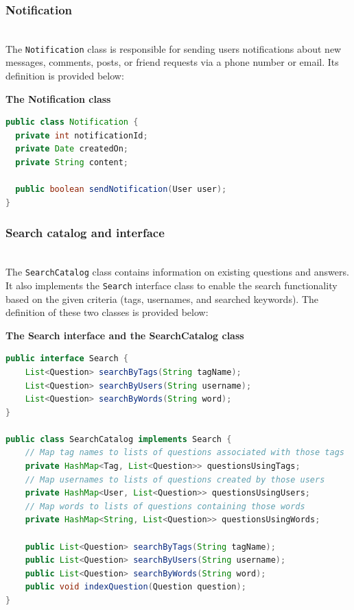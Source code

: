 \subsubsection{Notification}\label{0ZVCay7W6Bkab1KXP_cLz}
\\
The \texttt{Notification} class is responsible for sending users notifications about new messages, comments, posts, or friend requests via a phone number or email. Its definition is provided below:

\textbf{The Notification class}

\begin{lstlisting}[language=Java]
public class Notification {
  private int notificationId;
  private Date createdOn;
  private String content;

  public boolean sendNotification(User user);
}
\end{lstlisting}

\subsubsection{Search catalog and interface}\label{julu7b82zRwsJjYIajaE4-2}
\\
The \texttt{SearchCatalog} class contains information on existing questions and answers. It also implements the \texttt{Search} interface class to enable the search functionality based on the given criteria (tags, usernames, and searched keywords). The definition of these two classes is provided below:

\textbf{The Search interface and the SearchCatalog class}

\begin{lstlisting}[language=Java]
public interface Search {
    List<Question> searchByTags(String tagName);
    List<Question> searchByUsers(String username);
    List<Question> searchByWords(String word);
}

public class SearchCatalog implements Search {
    // Map tag names to lists of questions associated with those tags
    private HashMap<Tag, List<Question>> questionsUsingTags;
    // Map usernames to lists of questions created by those users
    private HashMap<User, List<Question>> questionsUsingUsers;
    // Map words to lists of questions containing those words
    private HashMap<String, List<Question>> questionsUsingWords;

    public List<Question> searchByTags(String tagName);
    public List<Question> searchByUsers(String username);
    public List<Question> searchByWords(String word);
    public void indexQuestion(Question question);
}
\end{lstlisting}

